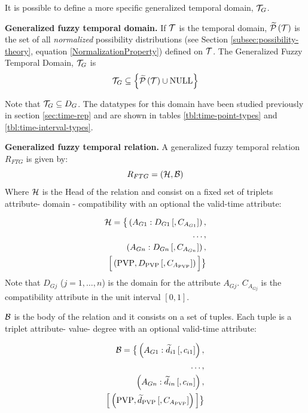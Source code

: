 It is possible to define a more specific generalized temporal domain, $\mathcal{T}_G$.

\begin{definition}
\label{def:generalized-fuzzy-temporal-domain}
\textbf{Generalized fuzzy temporal domain.}
If $\mathcal{T}$ is the temporal domain, $\widetilde {\mathcal{P}}\left( \mathcal{T}\right)$ is the set of all \emph{normalized} possibility distributions (see Section \ref{subsec:possibility-theory}, equation \eqref{NormalizationProperty}) defined on $\mathcal{T}$.
The Generalized Fuzzy Temporal Domain, $\mathcal{T}_G$ is
\begin{equation}
\mathcal{T}_G \subseteq \left \lbrace \widetilde {\mathcal{P}}\left( \mathcal{T}\right) \cup \text{NULL} \right \rbrace
\end{equation}
\end{definition}

Note that $\mathcal{T}_G \subseteq D_G$. The datatypes for this domain have been studied previously in section \ref{sec:time-rep} and are shown in tables \ref{tbl:time-point-types} and \ref{tbl:time-interval-types}.



\begin{definition}
\textbf{Generalized fuzzy temporal relation.}
A generalized fuzzy temporal relation $R_{FTG}$ is given by:
\label{def:generalized-fuzzy-temporal-relation}
\begin{equation}
\label{eq:generalized-fuzzy-temporal-relation}
R_{FTG} = \left(\mathcal{H}, \mathcal{B} \right)
\end{equation}
Where $\mathcal{H}$ is the Head of the relation and consist on a fixed set of triplets attribute- domain - compatibility with an optional the valid-time attribute:

\begin{align}
\label{eq:head-valid-time}
\mathcal{H} = \big \lbrace \left(A_{G1}:D_{G1}\left[,C_{A_{G1}} \right] \right),\\
\nonumber
 \ldots,\\
 \nonumber
  \left(A_{Gn}:D_{Gn}\left[,C_{A_{Gn}} \right] \right),\\
  \nonumber
  \Big[  \left( \text{PVP}, D_{\text{PVP}}\left[,C_{A_{\text{PVP}}} \right] \right) \Big] \big \rbrace
\end{align}
Note that $D_{Gj}$ ($j = 1, \ldots, n$) is the domain for the attribute $A_{Gj}$. $C_{A_{Gj}}$ is the compatibility attribute in the unit interval $\left[0, 1 \right]$.

$\mathcal{B}$ is the body of the relation and it consists on a set of tuples. Each tuple is a triplet attribute- value- degree with an optional valid-time attribute:

\begin{align}
\label{eq:body-valid-time}
\mathcal{B} = \big \lbrace \left(A_{G1}:\widetilde{d}_{i1}\left[,c_{i1} \right] \right),\\
\nonumber
 \ldots,\\
 \nonumber
  \left(A_{Gn}:\widetilde{d}_{in}\left[,c_{in} \right] \right),\\
  \nonumber
   \Big[  \left( \text{PVP}, \widetilde{d}_{\text{PVP}} \left[,C_{A_{\text{PVP}}} \right] \right)  \Big] \big \rbrace
\end{align}

\end{definition}


